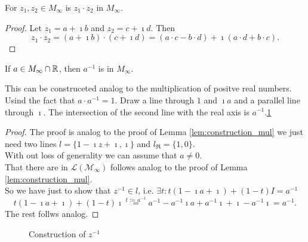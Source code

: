 \begin{corollary}
    \label{cor:construction_mul_complex}
    For $z_1, z_2 \in M_{\infty}$ is $z_1 \cdot z_2$ in $M_{\infty}$.
\end{corollary}
\begin{proof}
    Let $z_1 = a + \imath b$ and $z_2 = c + \imath d$. Then $$z_1 \cdot z_2 = (a + \imath b) \cdot (c + \imath d) = (a \cdot c - b \cdot d) + \imath (a \cdot d + b \cdot c).$$
    
\end{proof}

\begin{lemma}
    \label{lem:construction_inv}
    \leanok
    If $a \in M_{\infty}\cap\mathbb{R}$, then $a^{-1}$ is in  $M_{\infty}$.
\end{lemma}

This can be construceted analog to the multiplication of positve real numbers. Usind the fact that $a\cdot a^{-1} = 1$. Draw a line through $1$ and $\imath a$ and a parallel line through $\imath$. The intersection of the second line with the real axis is $a^{-1}$.\ref{Fig.6}
\begin{proof}
    The proof is analog to the proof of Lemma \ref{lem:construction_mul} we just need two lines $l = \{1-\imath z + \imath, \imath\}$ and $l_{\Re} = \{1,0\}$.\\
    With  out loss of generality we can assume that $a \ne 0$.\\
    That there are in $\mathcal{L(M_{\infty})}$ follows analog to the proof of Lemma \ref{lem:construction_mul}.\\ 
    So we have just to show that $z^{-1} \in l$, i.e. $\exists t: t  (1 - \imath a + \imath) + (1 - t)  I = a^{-1}$ $$t  (1 - \imath a + \imath) + (1 - t)  \imath \stackrel{t:=a^{-1}}{=}  a^{-1} - a^{-1} \imath a + a^{-1}\imath + \imath - a^{-1}\imath = a^{-1}.$$
    The rest follws analog.
\end{proof}
\begin{figure}
    \centering
    \caption{Construction of $z^{-1}$}
    \label{Fig.6}
\end{figure}